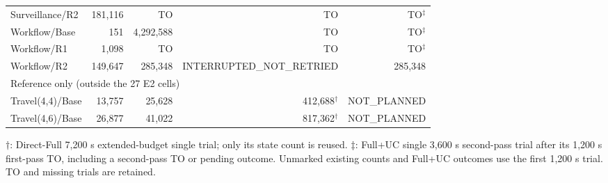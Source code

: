 \begin{table}[t]
\begin{tabular}{lrrrr}
Surveillance/R2 & 181,116 & TO & TO & TO$^{\ddagger}$ \\
Workflow/Base & 151 & 4,292,588 & TO & TO$^{\ddagger}$ \\
Workflow/R1 & 1,098 & TO & TO & TO$^{\ddagger}$ \\
Workflow/R2 & 149,647 & 285,348 & INTERRUPTED\_NOT\_RETRIED & 285,348 \\
\midrule
\multicolumn{5}{l}{Reference only (outside the 27 E2 cells)} \\
Travel(4,4)/Base & 13,757 & 25,628 & 412,688$^{\dagger}$ & NOT\_PLANNED \\
Travel(4,6)/Base & 26,877 & 41,022 & 817,362$^{\dagger}$ & NOT\_PLANNED \\
\bottomrule
\end{tabular}
\par\footnotesize $\dagger$: Direct-Full 7,200 s extended-budget single trial; only its state count is reused. $\ddagger$: Full+UC single 3,600 s second-pass trial after its 1,200 s first-pass TO, including a second-pass TO or pending outcome. Unmarked existing counts and Full+UC outcomes use the first 1,200 s trial. TO and missing trials are retained.
\end{table}

